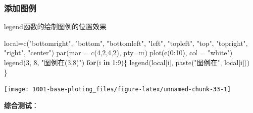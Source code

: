\documentclass[
]{book}
\newenvironment{Shaded}{\begin{snugshade}}{\end{snugshade}}
\newcommand{\AttributeTok}[1]{\textcolor[rgb]{0.77,0.63,0.00}{#1}}
\newcommand{\ControlFlowTok}[1]{\textcolor[rgb]{0.13,0.29,0.53}{\textbf{#1}}}
\newcommand{\DecValTok}[1]{\textcolor[rgb]{0.00,0.00,0.81}{#1}}
\newcommand{\FunctionTok}[1]{\textcolor[rgb]{0.00,0.00,0.00}{#1}}
\newcommand{\NormalTok}[1]{#1}
\newcommand{\OtherTok}[1]{\textcolor[rgb]{0.56,0.35,0.01}{#1}}
\newcommand{\SpecialCharTok}[1]{\textcolor[rgb]{0.00,0.00,0.00}{#1}}
\newcommand{\StringTok}[1]{\textcolor[rgb]{0.31,0.60,0.02}{#1}}
\begin{document}
\hypertarget{ux6dfbux52a0ux56feux4f8b}{%
\subsubsection{添加图例}\label{ux6dfbux52a0ux56feux4f8b}}

legend函数的绘制图例的位置效果

\begin{Shaded}
\begin{Highlighting}[]
\NormalTok{local}\OtherTok{=}\FunctionTok{c}\NormalTok{(}\StringTok{"bottomright"}\NormalTok{, }\StringTok{"bottom"}\NormalTok{, }\StringTok{"bottomleft"}\NormalTok{, }\StringTok{"left"}\NormalTok{, }\StringTok{"topleft"}\NormalTok{,}
        \StringTok{"top"}\NormalTok{, }\StringTok{"topright"}\NormalTok{, }\StringTok{"right"}\NormalTok{, }\StringTok{"center"}\NormalTok{)}
\FunctionTok{par}\NormalTok{(}\AttributeTok{mar =} \FunctionTok{c}\NormalTok{(}\DecValTok{4}\NormalTok{,}\DecValTok{2}\NormalTok{,}\DecValTok{4}\NormalTok{,}\DecValTok{2}\NormalTok{), }\AttributeTok{pty=}\StringTok{\textquotesingle{}m\textquotesingle{}}\NormalTok{)}
\FunctionTok{plot}\NormalTok{(}\FunctionTok{c}\NormalTok{(}\DecValTok{0}\SpecialCharTok{:}\DecValTok{10}\NormalTok{), }\AttributeTok{col =} \StringTok{"white"}\NormalTok{)}
\FunctionTok{legend}\NormalTok{(}\DecValTok{3}\NormalTok{, }\DecValTok{8}\NormalTok{, }\StringTok{"图例在(3,8)"}\NormalTok{)}
\ControlFlowTok{for}\NormalTok{(i }\ControlFlowTok{in} \DecValTok{1}\SpecialCharTok{:}\DecValTok{9}\NormalTok{)\{}
  \FunctionTok{legend}\NormalTok{(local[i], }\FunctionTok{paste}\NormalTok{(}\StringTok{"图例在"}\NormalTok{, local[i]))}
\NormalTok{\}}
\end{Highlighting}
\end{Shaded}

\begin{center}\texttt{[image: 1001-base-ploting\_files/figure-latex/unnamed-chunk-33-1]} \end{center}

\textbf{综合测试}：
\end{document}
